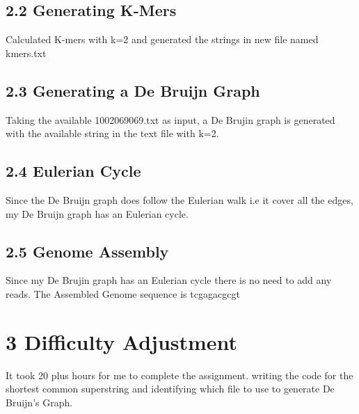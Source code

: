\documentclass{article}
\begin{document}
    
   \subsection*{2.2 Generating K-Mers } 
     \newline Calculated K-mers with k=2 and generated the strings in new file named kmers.txt
    \subsection*{2.3 Generating a De Bruijn Graph }
      Taking the available 1002069069.txt as input, a De Brujin graph is generated with the available string in the text file with k=2.
      
     \subsection*{2.4 Eulerian Cycle } 
 \newline Since the De Bruijn graph does follow the Eulerian walk i.e it cover all the edges, my De Bruijn graph has an Eulerian cycle. 
 
 \subsection*{2.5 Genome Assembly}
 \newline Since my De Brujin graph has an Eulerian cycle there is no need to add any reads.
                 \newline The Assembled Genome sequence is tcgagacgcgt
  \section*{3 Difficulty Adjustment}
  \newline It took 20 plus hours for me to complete the assignment.
  \newline writing the code for the shortest common superstring and identifying which file to use to generate De Bruijn's Graph.
\end{document}
